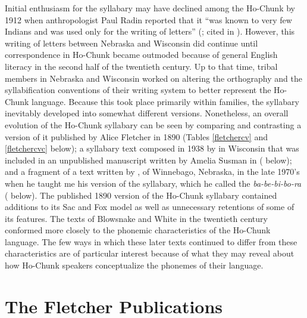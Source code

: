 \documentclass[output=paper]{LSP/langsci}
\begin{document}
Initial enthusiasm for the syllabary may have declined among the Ho-Chunk by 1912 when anthropologist Paul Radin reported that it ``was known to very few Indians and was used only for the writing of letters'' (\citealt[21]{Radin1954}; cited in \citealt[161]{Walker1981}). However, this writing of letters between Nebraska and Wisconsin did continue until correspondence in Ho-Chunk became outmoded because of general English literacy in the second half of the twentieth century. Up to that time, tribal members in Nebraska and Wisconsin worked on altering the orthography and the syllabification conventions of their writing system to better represent the Ho-Chunk language. Because this took place primarily within families, the syllabary inevitably developed into somewhat different versions. Nonetheless, an overall evolution of the Ho-Chunk syllabary can be seen by comparing and contrasting a version of it published by Alice Fletcher in 1890 (Tables \ref{fletchercv} and \ref{fletchercvc} below); a syllabary text composed in 1938 by  in Wisconsin that was included in an unpublished manuscript written by Amelia Susman in \citeyear{Susman1939} ( below); and a fragment of a text written by , of Winnebago, Nebraska, in the late 1970's when he taught me his version of the syllabary, which he called the \emph{ba-be-bi-bo-ra} ( below). The published 1890 version of the Ho-Chunk syllabary contained additions to its Sac and Fox model as well as unnecessary retentions of some of its features. The texts of Blowsnake and White in the twentieth century conformed more closely to the phonemic characteristics of the Ho-Chunk language. The few ways in which these later texts continued to differ from these characteristics are of particular interest because of what they may reveal about how Ho-Chunk speakers conceptualize the phonemes of their language.

\section{The Fletcher Publications}
\end{document}
